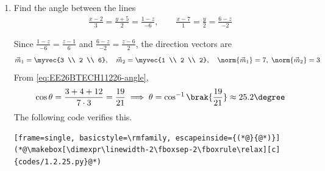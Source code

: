 \begin{enumerate}[label=\thesubsection.\arabic*, ref=\thesubsection.\theenumi, start=23]
\item Find the angle between the lines
\begin{align}
	\frac{x-2}{3} = \frac{y+5}{2} = \frac{1-z}{-6}, \qquad
	\frac{x-7}{1} = \frac{y}{2} = \frac{6-z}{-2}
\end{align}
\par\solution
Since $\frac{1-z}{-6} = \frac{z-1}{6}$ and $\frac{6-z}{-2} = \frac{z-6}{2}$, the direction vectors are
\begin{align}
	\vec{m}_1 = \myvec{3 \\ 2 \\ 6}, \quad \vec{m}_2 = \myvec{1 \\ 2 \\ 2},
	\quad \norm{\vec{m}_1} = 7, \; \norm{\vec{m}_2} = 3
\end{align}
From \eqref{eq:EE26BTECH11226-angle},
\begin{align}
	\cos\theta = \frac{3 + 4 + 12}{7 \cdot 3} = \frac{19}{21}
	\implies \theta = \cos^{-1}\brak{\frac{19}{21}} \approx 25.2\degree
\end{align}
The following code verifies this.
\begin{lstlisting}[frame=single, basicstyle=\rmfamily, escapeinside={(*@}{@*)}]
(*@\makebox[\dimexpr\linewidth-2\fboxsep-2\fboxrule\relax][c]{codes/1.2.25.py}@*)
\end{lstlisting}
\end{enumerate}

